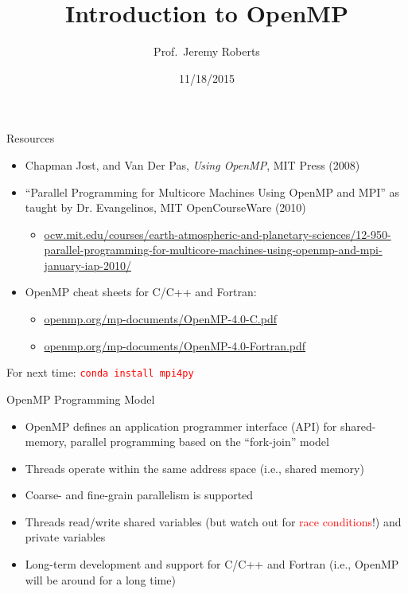 \documentclass[10pt]{beamer}
\title %
[OpenMP]{Introduction to OpenMP}
\author[Roberts]{Prof.~Jeremy Roberts}
\date
{11/18/2015}
\begin{document}
\begin{frame}[plain]
  \titlepage
\end{frame}


\begin{frame}{Resources}

\begin{itemize}
 \item Chapman Jost, and Van Der Pas, {\it Using OpenMP}, MIT Press (2008)
 \item ``Parallel Programming for Multicore Machines Using OpenMP and MPI''
       as taught by Dr. Evangelinos, MIT OpenCourseWare (2010)
       \begin{itemize}
         \item \url{ocw.mit.edu/courses/earth-atmospheric-and-planetary-sciences/12-950-parallel-programming-for-multicore-machines-using-openmp-and-mpi-january-iap-2010/}
       \end{itemize}
 \item OpenMP cheat sheets for C/C++ and Fortran:
       \begin{itemize}
         \item \url{openmp.org/mp-documents/OpenMP-4.0-C.pdf}
         \item \url{openmp.org/mp-documents/OpenMP-4.0-Fortran.pdf}
       \end{itemize}
\end{itemize}
\vfill
For next time: \textcolor{red}{\tt conda install mpi4py}

\end{frame}

\begin{frame}{OpenMP Programming Model}

\begin{itemize}
 \item OpenMP defines an application programmer interface (API) for 
       shared-memory, parallel programming based on the ``fork-join'' model
 \item Threads operate within the same address space (i.e., shared memory)
 \item Coarse- and fine-grain parallelism is supported
 \item Threads read/write shared variables (but watch out 
       for \textcolor{red}{race conditions}!) 
       and private variables
\item  Long-term development and support for C/C++ and Fortran (i.e.,
       OpenMP will be around for a long time)
\end{itemize}

\end{frame}
\end{document}
